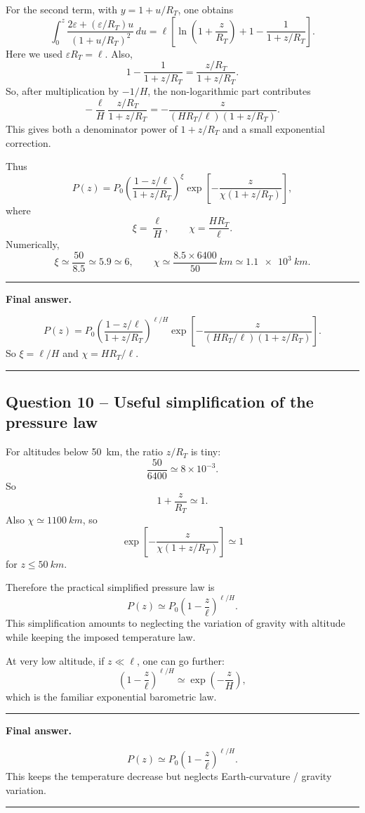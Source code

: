\documentclass[11pt,a4paper]{article}
\newenvironment{finalanswer}{%
  \begin{center}\begin{minipage}{0.94\linewidth}\hrule\vspace{0.45em}\textbf{Final answer. }%
}{%
  \vspace{0.45em}\hrule\end{minipage}\end{center}%
}
\newcommand{\RT}{R_T}
\begin{document}
For the second term, with $y=1+u/\RT$, one obtains
\[
\int_0^z \frac{2\varepsilon+(\varepsilon/\RT)u}{(1+u/\RT)^2}\,du
=\ell\left[\ln\left(1+\frac{z}{\RT}\right)+1-\frac{1}{1+z/\RT}\right].
\]
Here we used $\varepsilon\RT=\ell$. Also,
\[
1-\frac{1}{1+z/\RT}=\frac{z/\RT}{1+z/\RT}.
\]
So, after multiplication by $-1/H$, the non-logarithmic part contributes
\[
-\frac{\ell}{H}\frac{z/\RT}{1+z/\RT}
=-\frac{z}{(H\RT/\ell)(1+z/\RT)}.
\]
This gives both a denominator power of $1+z/\RT$ and a small exponential correction.

Thus
\[
P(z)=P_0
\left(\frac{1-z/\ell}{1+z/\RT}\right)^{\xi}
\exp\left[-\frac{z}{\chi(1+z/\RT)}\right],
\]
where
\[
 \xi=\frac{\ell}{H},
 \qquad
 \chi=\frac{H\RT}{\ell}.
\]
Numerically,
\[
 \xi\simeq\frac{50}{8.5}\simeq 5.9\simeq6,
 \qquad
 \chi\simeq\frac{8.5\times6400}{50}\,\si{km}\simeq\SI{1.1e3}{km}.
\]

\begin{finalanswer}
\[
P(z)=P_0
\left(\frac{1-z/\ell}{1+z/\RT}\right)^{\ell/H}
\exp\left[-\frac{z}{(H\RT/\ell)(1+z/\RT)}\right].
\]
So $\xi=\ell/H$ and $\chi=H\RT/\ell$.
\end{finalanswer}

\subsection*{Question 10 -- Useful simplification of the pressure law}

For altitudes below \SI{50}{km}, the ratio $z/\RT$ is tiny:
\[
 \frac{50}{6400}\simeq 8\times10^{-3}.
\]
So
\[
 1+\frac{z}{\RT}\simeq 1.
\]
Also $\chi\simeq\SI{1100}{km}$, so
\[
 \exp\left[-\frac{z}{\chi(1+z/\RT)}\right]\simeq 1
\]
for $z\leq\SI{50}{km}$.

Therefore the practical simplified pressure law is
\[
 P(z)\simeq P_0\left(1-\frac{z}{\ell}\right)^{\ell/H}.
\]
This simplification amounts to neglecting the variation of gravity with altitude while keeping the imposed temperature law.

At very low altitude, if $z\ll\ell$, one can go further:
\[
 \left(1-\frac{z}{\ell}\right)^{\ell/H}
 \simeq \exp\left(-\frac{z}{H}\right),
\]
which is the familiar exponential barometric law.

\begin{finalanswer}
\[
P(z)\simeq P_0\left(1-\frac{z}{\ell}\right)^{\ell/H}.
\]
This keeps the temperature decrease but neglects Earth-curvature / gravity variation.
\end{finalanswer}
\end{document}
